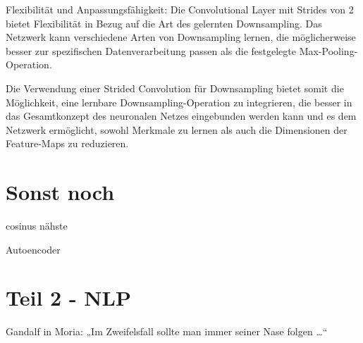 \documentclass[
fontsize=12pt,					%
paper=a4,						%
twoside=true, 					%
listof=totoc, 					%
bibliography=totoc,				%
titlepage, 						%
headsepline, 					%
DIV=12,							%
BCOR=6mm,						%
cleardoublepage=empty,			%
parskip,							%
ngerman
]{scrartcl}
\begin{document}
Flexibilität und Anpassungsfähigkeit: Die Convolutional Layer mit Strides von 2 bietet Flexibilität in Bezug auf die Art des gelernten Downsampling. Das Netzwerk kann verschiedene Arten von Downsampling lernen, die möglicherweise besser zur spezifischen Datenverarbeitung passen als die festgelegte Max-Pooling-Operation.

Die Verwendung einer Strided Convolution für Downsampling bietet somit die Möglichkeit, eine lernbare Downsampling-Operation zu integrieren, die besser in das Gesamtkonzept des neuronalen Netzes eingebunden werden kann und es dem Netzwerk ermöglicht, sowohl Merkmale zu lernen als auch die Dimensionen der Feature-Maps zu reduzieren.


\section{Sonst noch}

cosinus nähste

Autoencoder

\section{Teil 2 - NLP}

Gandalf in Moria: „Im Zweifelsfall sollte man immer seiner Nase folgen …“
\end{document}
